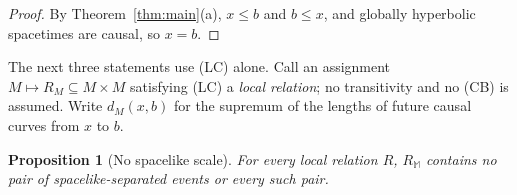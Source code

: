 \documentclass[11pt]{article}
\newtheorem{proposition}[theorem]{Proposition}
\theoremstyle{definition}
\newcommand{\Mink}{\mathbb M}
\begin{document}
\begin{proof}
By Theorem~\ref{thm:main}(a), $x\le b$ and $b\le x$, and globally hyperbolic
spacetimes are causal, so $x=b$.
\end{proof}

The next three statements use (LC) alone. Call an assignment $M\mapsto R_M
\subseteq M\times M$ satisfying (LC) a \emph{local relation}; no transitivity
and no (CB) is assumed. Write $d_M(x,b)$ for the supremum of the lengths of
future causal curves from $x$ to $b$.

\begin{proposition}[No spacelike scale]\label{prop:noscale}
For every local relation $R$, $R_\Mink$ contains no pair of spacelike-separated
events or every such pair.
\end{proposition}
\end{document}
